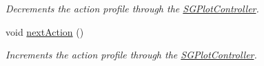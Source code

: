 \begin{DoxyCompactItemize}
\begin{DoxyCompactList}\small\item\em Decrements the action profile through the \hyperlink{classSGPlotController}{S\+G\+Plot\+Controller}. \end{DoxyCompactList}\item 
\mbox{\label{classSGSolutionHandler__V2_af42fbcd35489d4542a65fd5501291d81}} 
void \hyperlink{classSGSolutionHandler__V2_af42fbcd35489d4542a65fd5501291d81}{next\+Action} ()
\begin{DoxyCompactList}\small\item\em Increments the action profile through the \hyperlink{classSGPlotController}{S\+G\+Plot\+Controller}. \end{DoxyCompactList}\end{DoxyCompactItemize}
